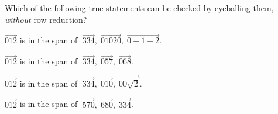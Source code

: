 \begin{pollframe}

\begin{poll}
\smallskip
\begin{bluebox}[Poll]{.8\textwidth}
  Which of the following true statements can be checked by eyeballing them,
  \emph{without} row reduction?
  \medskip
  \begin{eAlpherate}
  \item $\vec{0 1 2}$ is in the span of
    $\;\vec{3 3 4},\; \vec{0 10 20},\; \vec{0 -1 -2}$.
  \item $\vec{0 1 2}$ is in the span of
    $\;\vec{3 3 4},\; \vec{0 5 7},\; \vec{0 6 8}$.
  \item $\vec{0 1 2}$ is in the span of
    $\;\vec{3 3 4},\; \vec{0 1 0},\; \vec{0 0 \sqrt2}$.
  \item $\vec{0 1 2}$ is in the span of
    $\;\vec{5 7 0},\; \vec{6 8 0},\; \vec{3 3 4}$.
  \end{eAlpherate}
\end{bluebox}
\end{poll}


\end{pollframe}



